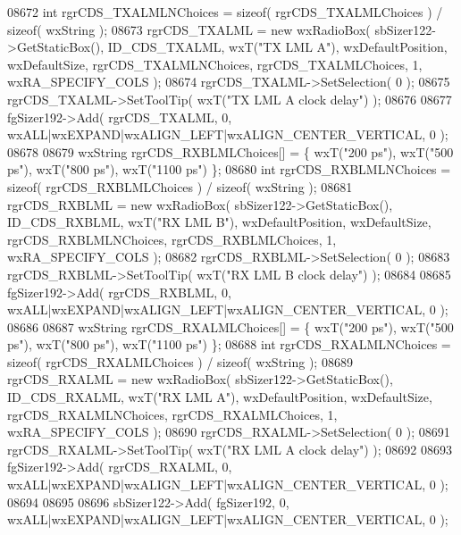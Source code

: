 \begin{DoxyCode}
08672     \textcolor{keywordtype}{int} rgrCDS\_TXALMLNChoices = \textcolor{keyword}{sizeof}( rgrCDS\_TXALMLChoices ) / \textcolor{keyword}{sizeof}( wxString );
08673     rgrCDS_TXALML = \textcolor{keyword}{new} wxRadioBox( sbSizer122->GetStaticBox(), ID_CDS_TXALML, wxT(\textcolor{stringliteral}{"TX LML A"}), 
      wxDefaultPosition, wxDefaultSize, rgrCDS\_TXALMLNChoices, rgrCDS\_TXALMLChoices, 1, wxRA\_SPECIFY\_COLS );
08674     rgrCDS_TXALML->SetSelection( 0 );
08675     rgrCDS_TXALML->SetToolTip( wxT(\textcolor{stringliteral}{"TX LML A clock delay"}) );
08676     
08677     fgSizer192->Add( rgrCDS_TXALML, 0, wxALL|wxEXPAND|wxALIGN\_LEFT|wxALIGN\_CENTER\_VERTICAL, 0 );
08678     
08679     wxString rgrCDS\_RXBLMLChoices[] = \{ wxT(\textcolor{stringliteral}{"200 ps"}), wxT(\textcolor{stringliteral}{"500 ps"}), wxT(\textcolor{stringliteral}{"800 ps"}), wxT(\textcolor{stringliteral}{"1100 ps"}) \};
08680     \textcolor{keywordtype}{int} rgrCDS\_RXBLMLNChoices = \textcolor{keyword}{sizeof}( rgrCDS\_RXBLMLChoices ) / \textcolor{keyword}{sizeof}( wxString );
08681     rgrCDS_RXBLML = \textcolor{keyword}{new} wxRadioBox( sbSizer122->GetStaticBox(), ID_CDS_RXBLML, wxT(\textcolor{stringliteral}{"RX LML B"}), 
      wxDefaultPosition, wxDefaultSize, rgrCDS\_RXBLMLNChoices, rgrCDS\_RXBLMLChoices, 1, wxRA\_SPECIFY\_COLS );
08682     rgrCDS_RXBLML->SetSelection( 0 );
08683     rgrCDS_RXBLML->SetToolTip( wxT(\textcolor{stringliteral}{"RX LML B clock delay"}) );
08684     
08685     fgSizer192->Add( rgrCDS_RXBLML, 0, wxALL|wxEXPAND|wxALIGN\_LEFT|wxALIGN\_CENTER\_VERTICAL, 0 );
08686     
08687     wxString rgrCDS\_RXALMLChoices[] = \{ wxT(\textcolor{stringliteral}{"200 ps"}), wxT(\textcolor{stringliteral}{"500 ps"}), wxT(\textcolor{stringliteral}{"800 ps"}), wxT(\textcolor{stringliteral}{"1100 ps"}) \};
08688     \textcolor{keywordtype}{int} rgrCDS\_RXALMLNChoices = \textcolor{keyword}{sizeof}( rgrCDS\_RXALMLChoices ) / \textcolor{keyword}{sizeof}( wxString );
08689     rgrCDS_RXALML = \textcolor{keyword}{new} wxRadioBox( sbSizer122->GetStaticBox(), ID_CDS_RXALML, wxT(\textcolor{stringliteral}{"RX LML A"}), 
      wxDefaultPosition, wxDefaultSize, rgrCDS\_RXALMLNChoices, rgrCDS\_RXALMLChoices, 1, wxRA\_SPECIFY\_COLS );
08690     rgrCDS_RXALML->SetSelection( 0 );
08691     rgrCDS_RXALML->SetToolTip( wxT(\textcolor{stringliteral}{"RX LML A clock delay"}) );
08692     
08693     fgSizer192->Add( rgrCDS_RXALML, 0, wxALL|wxEXPAND|wxALIGN\_LEFT|wxALIGN\_CENTER\_VERTICAL, 0 );
08694     
08695     
08696     sbSizer122->Add( fgSizer192, 0, wxALL|wxEXPAND|wxALIGN\_LEFT|wxALIGN\_CENTER\_VERTICAL, 0 );

\end{DoxyCode}
